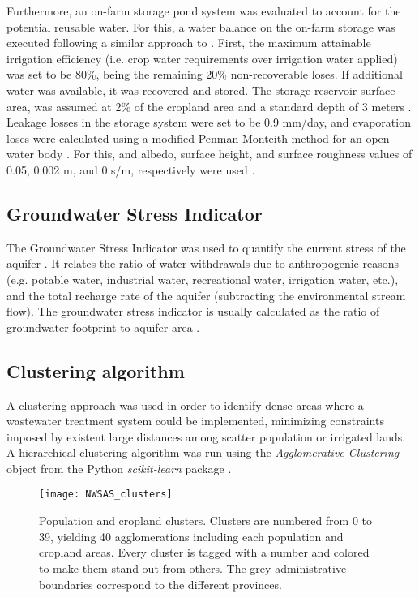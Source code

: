 Furthermore, an on-farm storage pond system was evaluated to account for the potential reusable water. For this, a water balance on the on-farm storage was executed following a similar approach to \citet{reinhartSimulatedWaterQuality2019}. First, the maximum attainable irrigation efficiency (i.e. crop water requirements over irrigation water applied) was set to be 80\%, being the remaining 20\% non-recoverable loses. If additional water was available, it was recovered and stored. The storage reservoir surface area, was assumed at 2\% of the cropland area and a standard depth of 3 meters \cite{reinhartSimulatedWaterQuality2019}. Leakage losses in the storage system were set to be 0.9 mm/day, and evaporation loses were calculated using a modified Penman-Monteith method for an open water body \cite{reinhartSimulatedWaterQuality2019}. For this, and albedo, surface height, and surface roughness values of 0.05, 0.002 m, and 0 s/m, respectively were used \cite{princeczarneckijobym.QuantifyingCaptureUse2017}.

\subsection{Groundwater Stress Indicator}
The Groundwater Stress Indicator was used to quantify the current stress of the aquifer \cite{Aqueductglobalmaps2015}. It relates the ratio of water withdrawals due to anthropogenic reasons (e.g. potable water, industrial water, recreational water, irrigation water, etc.), and the total recharge rate of the aquifer (subtracting the environmental stream flow). The groundwater stress indicator is usually calculated as the ratio of groundwater footprint to aquifer area \cite{RegionalGroundwaterStress2013}.

\subsection{Clustering algorithm}\label{Sc:clustering}
A clustering approach was used in order to identify dense areas where a wastewater treatment system could be implemented, minimizing constraints imposed by existent large distances among scatter population or irrigated lands. A hierarchical clustering  algorithm was run using the \textit{Agglomerative Clustering} object from the Python \textit{scikit-learn} package \cite{scikit-learn}.

\begin{figure*}[!b]
    \centering
	\texttt{[image: NWSAS\_clusters]}
	\caption{Population and cropland clusters. Clusters are numbered from 0 to 39, yielding 40 agglomerations including each population and cropland areas. Every cluster is tagged with a number and colored to make them stand out from others. The grey administrative boundaries correspond to the different provinces.}
	\label{fig:clusters}
\end{figure*}

